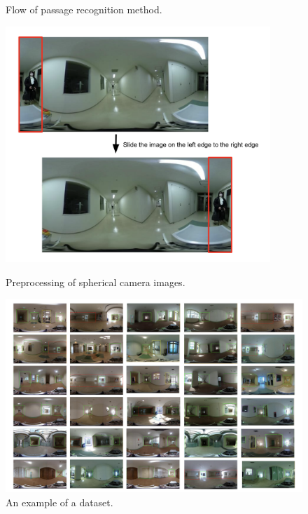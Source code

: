 \documentclass[../main]{subfiles}
\begin{document}
        \begin{figure}[H]
        \centering
        \caption{Flow of passage recognition method.}
        \label{figure::proposed_method_fig}
        
        \includegraphics[width=10cm]{image_proc_exp.png}
        \caption{Preprocessing of spherical camera images.}
        \label{figure::image_proc_fig}
        
        \includegraphics[width=15cm]{dataset_exp.png}
        \caption{An example of a dataset.}
        \label{figure::dataset_fig}


        \end{figure}
\end{document}

